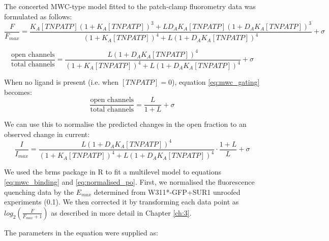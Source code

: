 The concerted MWC-type model fitted to the patch-clamp fluorometry data was formulated as follows:
\begin{equation} \label{eq:mwc_binding}
\frac{F}{F_{max}} = \frac
    {K_A[TNPATP](1+K_A[TNPATP])^3+LD_AK_A[TNPATP](1+D_AK_A[TNPATP])^3}
    {(1+K_A[TNPATP])^4+L(1+D_AK_A[TNPATP])^4} + \sigma
\end{equation}

\begin{equation} \label{eq:mwc_gating}
\frac{\text{open channels}}{\text{total channels}} = \frac
    {L(1+D_AK_A[TNPATP])^4}
    {(1+K_A[TNPATP])^4+L(1+D_AK_A[TNPATP])^4} + \sigma
\end{equation}

When no ligand is present (i.e. when $[TNPATP] = 0$), equation \ref{eq:mwc_gating} becomes:
\begin{equation} \label{eq:intrinsic_po}
\frac{\text{open channels}}{\text{total channels}} = \frac
    {L}
    {1+L} + \sigma
\end{equation}

We can use this to normalise the predicted changes in the open fraction to an observed change in current:
\begin{equation} \label{eq:normalised_po}
\frac{I}{I_{max}} = \frac
    {L(1+D_AK_A[TNPATP])^4}
    {(1+K_A[TNPATP])^4+L(1+D_AK_A[TNPATP])^4}\cdot
   \frac
    {1+L}
    {L} + \sigma
\end{equation}

We used the brms package in R to fit a multilevel model to equations \ref{eq:mwc_binding} and \ref{eq:normalised_po}.
First, we normalised the fluorescence quenching data by the $E_{max}$ determined from W311*-GFP+SUR1 unroofed experiments (0.1).
We then corrected it by transforming each data point as $log_2(\frac{F}{F_{max} + 1})$ as described in more detail in Chapter \ref{ch:3}.

The parameters in the equation were supplied as:


